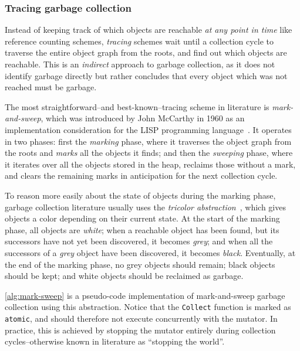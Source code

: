 \subsubsection{Tracing garbage collection}

Instead of keeping track of which objects are reachable \emph{at any point in time} like reference counting schemes, \emph{tracing} schemes wait until a collection cycle to traverse the entire object graph from the roots, and find out which objects are reachable. This is an \emph{indirect} approach to garbage collection, as it does not identify garbage directly but rather concludes that every object which was not reached must be garbage.

The most straightforward--and best-known--tracing scheme in literature is \emph{mark-and-sweep}, which was introduced by John McCarthy in 1960 as an implementation consideration for the LISP programming language~\cite{mccarthy60}. It operates in two phases: first the \emph{marking} phase, where it traverses the object graph from the roots and \emph{marks} all the objects it finds; and then the \emph{sweeping} phase, where it iterates over all the objects stored in the heap, reclaims those without a mark, and clears the remaining marks in anticipation for the next collection cycle.

To reason more easily about the state of objects during the marking phase, garbage collection literature usually uses the \emph{tricolor abstraction}~\cite{dijkstra78}, which gives objects a color depending on their current state. At the start of the marking phase, all objects are \emph{white}; when a reachable object has been found, but its successors have not yet been discovered, it becomes \emph{grey}; and when all the successors of a \emph{grey} object have been discovered, it becomes \emph{black}. Eventually, at the end of the marking phase, no grey objects should remain; black objects should be kept; and white objects should be reclaimed as garbage.

\cref{alg:mark-sweep} is a pseudo-code implementation of mark-and-sweep garbage collection using this abstraction. Notice that the \texttt{Collect} function is marked as \texttt{atomic}, and should therefore not execute concurrently with the mutator. In practice, this is achieved by stopping the mutator entirely during collection cycles--otherwise known in literature as ``stopping the world''.

\vspace{-.5em}

\vspace{-.5em}


